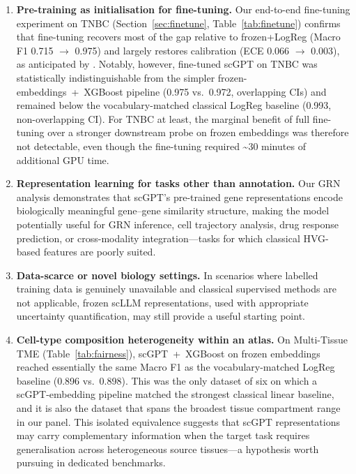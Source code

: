 \documentclass[11pt,a4paper]{article}
\begin{document}
\begin{enumerate}
    \item \textbf{Pre-training as initialisation for fine-tuning.} Our end-to-end fine-tuning experiment on TNBC (Section~\ref{sec:finetune}, Table~\ref{tab:finetune}) confirms that fine-tuning recovers most of the gap relative to frozen+LogReg (Macro F1 0.715 $\rightarrow$ 0.975) and largely restores calibration (ECE 0.066 $\rightarrow$ 0.003), as anticipated by \citet{Cui2024}. Notably, however, fine-tuned scGPT on TNBC was statistically indistinguishable from the simpler frozen-embeddings~+~XGBoost pipeline (0.975 vs.\ 0.972, overlapping CIs) and remained below the vocabulary-matched classical LogReg baseline (0.993, non-overlapping CI). For TNBC at least, the marginal benefit of full fine-tuning over a stronger downstream probe on frozen embeddings was therefore not detectable, even though the fine-tuning required \textasciitilde 30 minutes of additional GPU time.
    \item \textbf{Representation learning for tasks other than annotation.} Our GRN analysis demonstrates that scGPT's pre-trained gene representations encode biologically meaningful gene--gene similarity structure, making the model potentially useful for GRN inference, cell trajectory analysis, drug response prediction, or cross-modality integration---tasks for which classical HVG-based features are poorly suited.
    \item \textbf{Data-scarce or novel biology settings.} In scenarios where labelled training data is genuinely unavailable and classical supervised methods are not applicable, frozen scLLM representations, used with appropriate uncertainty quantification, may still provide a useful starting point.
    \item \textbf{Cell-type composition heterogeneity within an atlas.} On Multi-Tissue TME (Table~\ref{tab:fairness}), scGPT~+~XGBoost on frozen embeddings reached essentially the same Macro F1 as the vocabulary-matched LogReg baseline (0.896 vs.\ 0.898). This was the only dataset of six on which a scGPT-embedding pipeline matched the strongest classical linear baseline, and it is also the dataset that spans the broadest tissue compartment range in our panel. This isolated equivalence suggests that scGPT representations may carry complementary information when the target task requires generalisation across heterogeneous source tissues---a hypothesis worth pursuing in dedicated benchmarks.
\end{enumerate}
\end{document}

